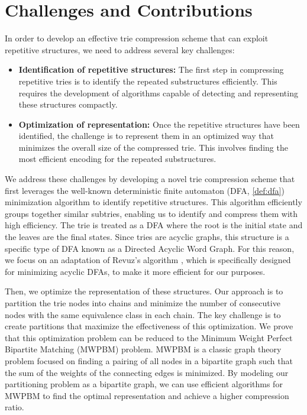 \section{Challenges and Contributions}
In order to develop an effective trie compression scheme that can exploit repetitive structures, we need to address several key challenges:
\begin{itemize}
    \item \textbf{Identification of repetitive structures:} The first step in compressing repetitive tries is to identify the repeated substructures efficiently. This requires the development of algorithms capable of detecting and representing these structures compactly.
    \item \textbf{Optimization of representation:} Once the repetitive structures have been identified, the challenge is to represent them in an optimized way that minimizes the overall size of the compressed trie. This involves finding the most efficient encoding for the repeated substructures.
\end{itemize}

We address these challenges by developing a novel trie compression scheme that first leverages the well-known deterministic finite automaton (DFA, \ref{def:dfa}) minimization algorithm \cite{revuz1992minimisation} to identify repetitive structures. This algorithm efficiently groups together similar subtries, enabling us to identify and compress them with high efficiency. The trie is treated as a DFA where the root is the initial state and the leaves are the final states. Since tries are acyclic graphs, this structure is a specific type of DFA known as a Directed Acyclic Word Graph. For this reason, we focus on an adaptation of Revuz's algorithm \cite{revuz1992minimisation}, which is specifically designed for minimizing acyclic DFAs, to make it more efficient for our purposes.

Then, we optimize the representation of these structures. Our approach is to partition the trie nodes into chains and minimize the number of consecutive nodes with the same equivalence class in each chain. The key challenge is to create partitions that maximize the effectiveness of this optimization. We prove that this optimization problem can be reduced to the Minimum Weight Perfect Bipartite Matching (MWPBM) problem. MWPBM is a classic graph theory problem focused on finding a pairing of all nodes in a bipartite graph such that the sum of the weights of the connecting edges is minimized. By modeling our partitioning problem as a bipartite graph, we can use efficient algorithms for MWPBM to find the optimal representation and achieve a higher compression ratio.

